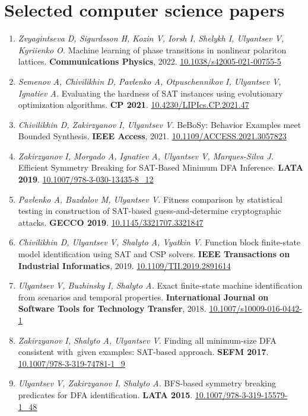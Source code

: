 \documentclass[11pt,a4paper,sans]{moderncv}        %
\newcommand{\doi}[1]{\href{http://doi.org/#1}{#1}}
\begin{document}
\section{Selected computer science papers}
\begin{enumerate}
  \item\emph{Zvyagintseva D, Sigurdsson H, Kozin V, Iorsh I, Shelykh I, Ulyantsev V, Kyriienko O.}
       Machine learning of phase transitions in nonlinear polariton lattices.
       \textbf{Communications Physics}, 2022.
       \doi{10.1038/s42005-021-00755-5}
  \item\emph{Semenov A, Chivilikhin D, Pavlenko A, Otpuschennikov I, Ulyantsev V, Ignatiev A.}
       Evaluating the hardness of SAT instances using evolutionary optimization algorithms.
       \textbf{CP 2021}.
       \doi{10.4230/LIPIcs.CP.2021.47}
  \item\emph{Chivilikhin D, Zakirzyanov I, Ulyantsev V.}
       BeBoSy: Behavior Examples meet Bounded Synthesis.
       \textbf{IEEE Access}, 2021.
       \doi{10.1109/ACCESS.2021.3057823}
  \item\emph{Zakirzyanov I, Morgado A, Ignatiev A, Ulyantsev V, Marques-Silva J.}
       Efficient Symmetry Breaking for SAT-Based Minimum DFA Inference.
       \textbf{LATA 2019}.
       \doi{10.1007/978-3-030-13435-8\_12}
  \item\emph{Pavlenko A, Buzdalov M, Ulyantsev V.}
       Fitness comparison by statistical testing in construction of SAT-based guess-and-determine cryptographic attacks.
       \textbf{GECCO 2019}.
       \doi{10.1145/3321707.3321847}
  \item\emph{Chivilikhin D, Ulyantsev V, Shalyto A, Vyatkin V.}
       Function block finite-state model identification using SAT and CSP solvers.
       \textbf{IEEE Transactions on Industrial Informatics}, 2019.
       \doi{10.1109/TII.2019.2891614}
  \item\emph{Ulyantsev V, Buzhinsky I, Shalyto A.}
       Exact finite-state machine identification from scenarios and temporal properties.
       \textbf{International Journal on Software Tools for Technology Transfer}, 2018.
       \doi{10.1007/s10009-016-0442-1}
  \item\emph{Zakirzyanov I, Shalyto A, Ulyantsev V.}
       Finding all minimum-size DFA consistent with given examples: SAT-based approach.
       \textbf{SEFM 2017}.
       \doi{10.1007/978-3-319-74781-1\_9}
  \item\emph{Ulyantsev V, Zakirzyanov I, Shalyto A.}
       BFS-based symmetry breaking predicates for DFA identification.
       \textbf{LATA 2015}.
       \doi{10.1007/978-3-319-15579-1\_48}
\end{enumerate}
\end{document}
